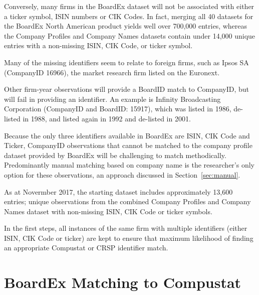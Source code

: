 \documentclass[12pt]{article}
\begin{document}
Conversely, many firms in the BoardEx dataset will not be associated with either a ticker symbol, ISIN numbers or CIK Codes.
In fact, merging all 40 datasets for the BoardEx North American product yields well over 700,000 entries, whereas the Company Profiles and Company Names datasets contain under 14,000 unique entries with a non-missing ISIN, CIK Code, or ticker symbol.

Many of the missing identifiers seem to relate to foreign firms, such as Ipsos SA (CompanyID 16966), the market research firm listed on the Euronext.

Other firm-year observations will provide a BoardID match to CompanyID, but will fail in providing an identifier.
An example is Infinity Broadcasting Corporation (CompanyID and BoardID: 15917), which was listed in 1986, de-listed in 1988, and listed again in 1992 and de-listed in 2001.

\begin{center}

\end{center}

Because the only three identifiers available in BoardEx are ISIN, CIK Code and Ticker, CompanyID observations that cannot be matched to the company profile dataset provided by BoardEx will be challenging to match methodically.
Predominantly manual matching based on company name is the researcher's only option for these observations, an approach discussed in Section~\ref{sec:manual}.

As at Novermber 2017, the starting dataset includes approximately 13,600 entries; unique observations from the combined Company Profiles and Company Names dataset with non-missing ISIN, CIK Code or ticker symbols.

In the first steps, all instances of the same firm with multiple identifiers (either ISIN, CIK Code or ticker) are kept to ensure that maximum likelihood of finding an appropriate Compustat or CRSP identifier match.


\section{BoardEx Matching to Compustat}\label{sec:BoardexCOMP}
\end{document}
